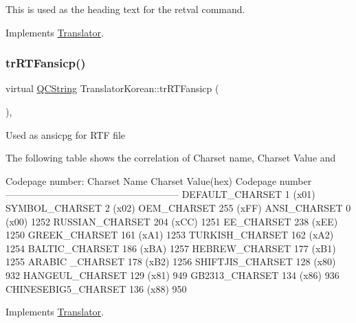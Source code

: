 This is used as the heading text for the retval command. 

Implements \mbox{\hyperlink{class_translator}{Translator}}.

\mbox{\label{class_translator_korean_a9f814151d64327b59b1819e756329d9f}} 
\subsubsection{\texorpdfstring{trRTFansicp()}{trRTFansicp()}}
{\footnotesize\ttfamily virtual \mbox{\hyperlink{class_q_c_string}{Q\+C\+String}} Translator\+Korean\+::tr\+R\+T\+Fansicp (\begin{DoxyParamCaption}{ }\end{DoxyParamCaption})\hspace{0.3cm}{\ttfamily [inline]}, {\ttfamily [virtual]}}

Used as ansicpg for R\+TF file

The following table shows the correlation of Charset name, Charset Value and 
\begin{DoxyPre}
Codepage number:
Charset Name       Charset Value(hex)  Codepage number
------------------------------------------------------
DEFAULT\_CHARSET           1 (x01)
SYMBOL\_CHARSET            2 (x02)
OEM\_CHARSET             255 (xFF)
ANSI\_CHARSET              0 (x00)            1252
RUSSIAN\_CHARSET         204 (xCC)            1251
EE\_CHARSET              238 (xEE)            1250
GREEK\_CHARSET           161 (xA1)            1253
TURKISH\_CHARSET         162 (xA2)            1254
BALTIC\_CHARSET          186 (xBA)            1257
HEBREW\_CHARSET          177 (xB1)            1255
ARABIC \_CHARSET         178 (xB2)            1256
SHIFTJIS\_CHARSET        128 (x80)             932
HANGEUL\_CHARSET         129 (x81)             949
GB2313\_CHARSET          134 (x86)             936
CHINESEBIG5\_CHARSET     136 (x88)             950
\end{DoxyPre}
 

Implements \mbox{\hyperlink{class_translator_a9953a4c0e6a4fc7d017abcd5c2939e0f}{Translator}}.

\mbox{\label{class_translator_korean_abc7c0238b498ea5bf2a6c9aeafac207d}} 
